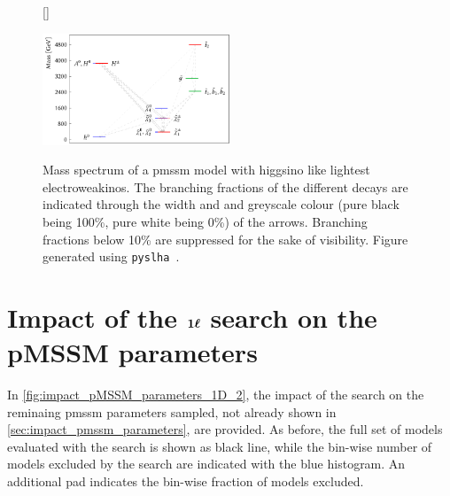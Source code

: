 \begin{figure}[h]
[\FBwidth]
{\caption{Mass spectrum of a \gls{pmssm} model with higgsino like lightest electroweakinos. The branching fractions of the different decays are indicated through the width and and greyscale colour (pure black being 100\%, pure white being 0\%) of the arrows. Branching fractions below 10\% are suppressed for the sake of visibility. Figure generated using \texttt{pyslha}~\cite{pyslha:2013jua}.}\label{fig:higgsino_spectrum}}
{\includegraphics[width=0.50\textwidth]{thesis_plot_6898.pdf}}
\end{figure}

\FloatBarrier

\section[Impact of the \onelepton search on the pMSSM parameters]{Impact of the $\makemebold{1\ell}$ search on the pMSSM parameters}

In \cref{fig:impact_pMSSM_parameters_1D_2}, the impact of the \onelepton search on the reminaing \gls{pmssm} parameters sampled, not already shown in \cref{sec:impact_pmssm_parameters}, are provided. As before, the full set of models evaluated with the \onelepton search is shown as black line, while the bin-wise number of models excluded by the search are indicated with the blue histogram. An additional pad indicates the bin-wise fraction of models excluded.

